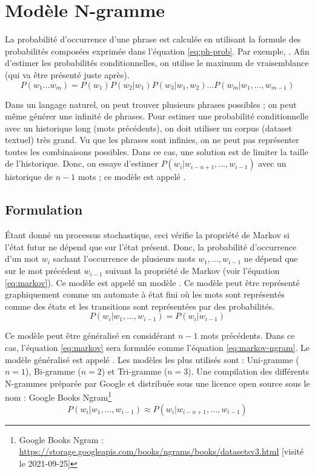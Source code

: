 \documentclass{KodeBook}
\begin{document}
\section{Modèle N-gramme}

La probabilité d'occurrence d'une phrase est calculée en utilisant la formule des probabilités composées exprimée dans l'équation \ref{eq:ph-prob}.
Par exemple, .
Afin d'estimer les probabilités conditionnelles, on utilise le maximum de vraisemblance (qui va être présenté juste après).
\begin{equation}\label{eq:ph-prob}
	P(w_1 \ldots w_m) =  P(w_1) P(w_2 | w_1) P(w_3 | w_1, w_2) \ldots P(w_m | w_1, \ldots, w_{m-1})
\end{equation}

Dans un langage naturel, on peut trouver plusieurs phrases possibles ; on peut même générer une infinité de phrases.
Pour estimer une probabilité conditionnelle avec un historique long (mots précédents), on doit utiliser un corpus (dataset textuel) très grand. 
Vu que les phrases sont infinies, on ne peut pas représenter toutes les combinaisons possibles. 
Dans ce cas, une solution est de limiter la taille de l'historique. 
Donc, on essaye d'estimer $P(w_i|w_{i-n+1},\ldots,w_{i-1})$ avec un historique de $n-1$ mots ; 
ce modèle est appelé .

\subsection{Formulation}

Étant donné un processus stochastique, ceci vérifie la propriété de Markov si l'état futur ne dépend que sur l'état présent. 
Donc, la probabilité d'occurrence d'un mot $w_i$ sachant l'occurrence de plusieurs mots $w_1, \ldots, w_{i-1}$ ne dépend que sur le mot précédent $w_{i-1}$ suivant la propriété de Markov (voir l'équation \ref{eq:markov}). 
Ce modèle est appelé un modèle .
Ce modèle peut être représenté graphiquement comme un automate à état fini où les mots sont représentés comme des états et les transitions sont représentées par des probabilités.
\begin{equation}
	P(w_i | w_1,\ldots, w_{i-1}) = P(w_i | w_{i-1})
	\label{eq:markov}
\end{equation}

Ce modèle peut être généralisé en considérant $n-1$ mots précédents. 
Dans ce cas, l'équation \ref{eq:markov} sera formulée comme l'équation \ref{eq:markov-ngram}.
Le modèle généralisé est appelé .
Les modèles les plus utilisés sont : Uni-gramme ($n=1$), Bi-gramme ($n=2$) et Tri-gramme ($n=3$).
Une compilation des différents N-grammes préparée par Google et distribuée sous une licence open source sous le nom : Google Books Ngram\footnote{Google Books Ngram : \url{https://storage.googleapis.com/books/ngrams/books/datasetsv3.html} [visité le 2021-09-25]}
\begin{equation}
	P(w_i | w_1,\ldots, w_{i-1}) \approx P(w_i | w_{i-n+1}, \ldots, w_{i-1})
	\label{eq:markov-ngram}
\end{equation}
\end{document}
